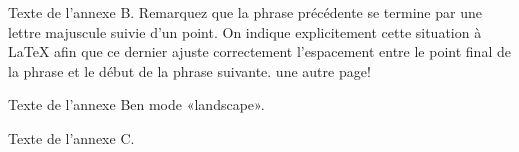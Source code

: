 Texte de l'annexe B\@. Remarquez que la phrase précédente se termine
par une lettre majuscule suivie d'un point. On indique explicitement
cette situation à \LaTeX{} afin que ce dernier ajuste correctement
l'espacement entre le point final de la phrase et le début de la
phrase suivante.
une autre page!


\begin{landscape}
Texte de l'annexe B\@ en mode «landscape».
\end{landscape}

Texte de l'annexe C\@.
